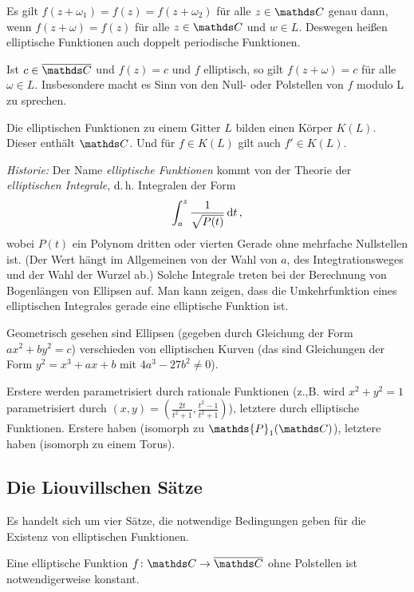 \begin{beme-list}
\item Es gilt $f(z+\omega_1) = f(z) = f(z+\omega_2)$ für alle $z\in\CC$ genau dann, wenn $f(z+\omega) = f(z)$ für alle $z\in\CC$ und $w\in L$.
Deswegen heißen elliptische Funktionen auch doppelt periodische Funktionen.

\item Ist $c\in\closure\CC$ und $f(z) = c$ und $f$ elliptisch, so gilt $f(z+\omega) = c$ für alle $\omega \in L$.
Insbesondere macht es Sinn von den Null- oder Polstellen von $f$ modulo L zu sprechen.

\item Die elliptischen Funktionen zu einem Gitter $L$ bilden einen Körper $K(L)$. Dieser enthält $\CC$. Und für $f\in K(L)$ gilt auch $f'\in K(L)$.

\item \emph{Historie:} Der Name \emph{elliptische Funktionen} kommt von der Theorie der \emph{elliptischen Integrale}, d.\,h. Integralen der Form
\[
	\int_a^z \frac{1}{\sqrt{P(t)}} \,\mathrm{d} t
	\,,
\]
wobei $P(t)$ ein Polynom dritten oder vierten Gerade ohne mehrfache Nullstellen ist.
(Der Wert hängt im Allgemeinen von der Wahl von $a$, des Integtrationsweges und der Wahl der Wurzel ab.)
Solche Integrale treten bei der Berechnung von Bogenlängen von Ellipsen auf.
Man kann zeigen, dass die Umkehrfunktion eines elliptischen Integrales gerade eine elliptische Funktion ist.

Geometrisch gesehen sind Ellipsen (gegeben durch Gleichung der Form $ax^2+by^2 = c$) verschieden von elliptischen Kurven (das sind Gleichungen der Form $y^2 = x^3+ax+b$ mit $4a^3 - 27b^2 \not= 0$).

Erstere werden parametrisiert durch rationale Funktionen (z.,B. wird $x^2+y^2 = 1$ parametrisiert durch $(x, y) = (\frac{2t}{t^2+1}, \frac{t^2-1}{t^2+1})$), letztere durch elliptische Funktionen.
Erstere haben  (isomorph zu $\mathds{P}_1(\CC)$), letztere haben  (isomorph zu einem Torus).
\end{beme-list}

\subsection{Die Liouvillschen Sätze}

Es handelt sich um vier Sätze, die notwendige Bedingungen geben für die Existenz von elliptischen Funktionen.

\begin{satz}\label{satz:liouville-1}
Eine elliptische Funktion $f\colon \CC \ra \closure \CC$ ohne Polstellen ist notwendigerweise konstant.
\end{satz}

